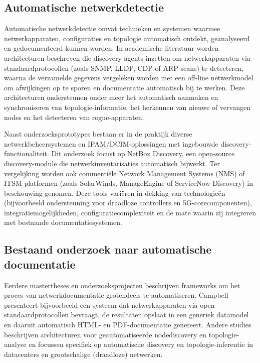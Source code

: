 \subsection{Automatische netwerkdetectie}

Automatische netwerkdetectie omvat technieken en systemen waarmee netwerkapparaten, configuraties en topologie automatisch ontdekt, geanalyseerd en gedocumenteerd kunnen worden. In academische literatuur worden architecturen beschreven die discovery-agents inzetten om netwerkapparaten via standaardprotocollen (zoals SNMP, LLDP, CDP of ARP-scans) te detecteren, waarna de verzamelde gegevens vergeleken worden met een off-line netwerkmodel om afwijkingen op te sporen en documentatie automatisch bij te werken.\autocite{Campbell2007,AutomaticTopology2013} Deze architecturen ondersteunen onder meer het automatisch aanmaken en synchroniseren van topologie-informatie, het herkennen van nieuwe of vervangen nodes en het detecteren van rogue-apparaten.\autocite{AutomaticTopology2013,WirelessTopology2015}

Naast onderzoeksprototypes bestaan er in de praktijk diverse netwerkbeheersystemen en IPAM/DCIM-oplossingen met ingebouwde discovery-functionaliteit. Dit onderzoek focust op NetBox Discovery, een open-source discovery-module die netwerkinventarisaties automatisch bijwerkt. Ter vergelijking worden ook commerciële Network Management Systems (NMS) of ITSM-platformen (zoals SolarWinds, ManageEngine of ServiceNow Discovery) in beschouwing genomen.\autocite{NetBoxDiscoveryDocs,ServiceNowDiscovery} Deze tools variëren in dekking van technologieën (bijvoorbeeld ondersteuning voor draadloze controllers en 5G-corecomponenten), integratiemogelijkheden, configuratiecomplexiteit en de mate waarin zij integreren met bestaande documentatiesystemen.

\subsection{Bestaand onderzoek naar automatische documentatie}

Eerdere mastertheses en onderzoeksprojecten beschrijven frameworks om het proces van netwerkdocumentatie grotendeels te automatiseren. Campbell presenteert bijvoorbeeld een systeem dat netwerkapparaten via open standaardprotocollen bevraagt, de resultaten opslaat in een generiek datamodel en daaruit automatisch HTML- en PDF-documentatie genereert.\autocite{Campbell2007} Andere studies beschrijven architecturen voor geautomatiseerde nodediscovery en topologie-analyse en focussen specifiek op automatische discovery en topologie-inferentie in datacenters en grootschalige (draadloze) netwerken.\autocite{AutomaticTopology2013,WirelessTopology2015}

